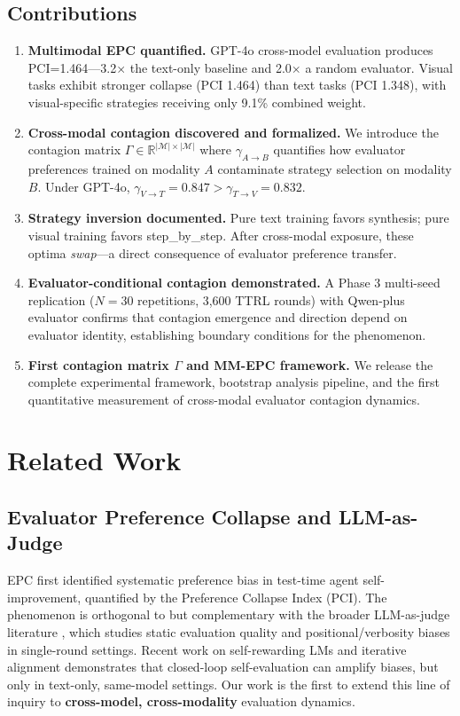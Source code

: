 \documentclass[11pt,a4paper]{article}
\begin{document}
\subsection{Contributions}
\begin{enumerate}[leftmargin=*]
    \item \textbf{Multimodal EPC quantified.} GPT-4o cross-model evaluation produces PCI=1.464---3.2$\times$ the text-only baseline and 2.0$\times$ a random evaluator. Visual tasks exhibit stronger collapse (PCI 1.464) than text tasks (PCI 1.348), with visual-specific strategies receiving only 9.1\% combined weight.
    \item \textbf{Cross-modal contagion discovered and formalized.} We introduce the contagion matrix $\Gamma \in \mathbb{R}^{|\mathcal{M}|\times|\mathcal{M}|}$ where $\gamma_{A\to B}$ quantifies how evaluator preferences trained on modality $A$ contaminate strategy selection on modality $B$. Under GPT-4o, $\gamma_{V\to T}=0.847 > \gamma_{T\to V}=0.832$.
    \item \textbf{Strategy inversion documented.} Pure text training favors synthesis; pure visual training favors step\_by\_step. After cross-modal exposure, these optima \textit{swap}---a direct consequence of evaluator preference transfer.
    \item \textbf{Evaluator-conditional contagion demonstrated.} A Phase 3 multi-seed replication ($N=30$ repetitions, 3,600 TTRL rounds) with Qwen-plus evaluator confirms that contagion emergence and direction depend on evaluator identity, establishing boundary conditions for the phenomenon.
    \item \textbf{First contagion matrix $\Gamma$ and MM-EPC framework.} We release the complete experimental framework, bootstrap analysis pipeline, and the first quantitative measurement of cross-modal evaluator contagion dynamics.
\end{enumerate}

\section{Related Work}

\subsection{Evaluator Preference Collapse and LLM-as-Judge}

EPC \cite{liu2026epc} first identified systematic preference bias in test-time agent self-improvement, quantified by the Preference Collapse Index (PCI). The phenomenon is orthogonal to but complementary with the broader LLM-as-judge literature \cite{zheng2023judging, li2024alpacaeval, verga2024arbiter}, which studies static evaluation quality and positional/verbosity biases in single-round settings. Recent work on self-rewarding LMs \cite{yuan2024selfrewarding} and iterative alignment \cite{chen2024selfplay} demonstrates that closed-loop self-evaluation can amplify biases, but only in text-only, same-model settings. Our work is the first to extend this line of inquiry to \textbf{cross-model, cross-modality} evaluation dynamics.
\end{document}
